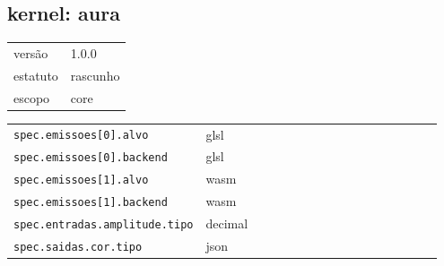 \subsection*{kernel: aura}
\begin{tabular}{@{}ll@{}}
versão & 1.0.0 \\
estatuto & rascunho \\
escopo & core \\
\end{tabular}

\begin{tabular}{@{}p{0.35\linewidth}p{0.6\linewidth}@{}}
\texttt{spec.emissoes[0].alvo} & glsl \\
\texttt{spec.emissoes[0].backend} & glsl \\
\texttt{spec.emissoes[1].alvo} & wasm \\
\texttt{spec.emissoes[1].backend} & wasm \\
\texttt{spec.entradas.amplitude.tipo} & decimal \\
\texttt{spec.saidas.cor.tipo} & json \\
\end{tabular}
